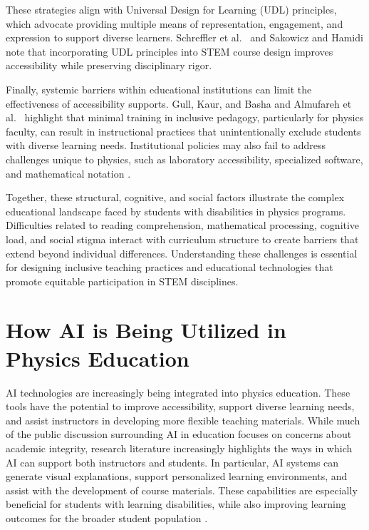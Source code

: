 \documentclass[]{aastex701}
\begin{document}
These strategies align with Universal Design for Learning (UDL) principles, which advocate providing multiple means of representation, engagement, and expression to support diverse learners. Schreffler et al.\ \autocite{Schreffler2019} and Sakowicz and Hamidi \autocite{Sakowicz2025} note that incorporating UDL principles into STEM course design improves accessibility while preserving disciplinary rigor.

Finally, systemic barriers within educational institutions can limit the effectiveness of accessibility supports. Gull, Kaur, and Basha \autocite{Gull2025} and Almufareh et al.\ \autocite{Almufareh2025} highlight that minimal training in inclusive pedagogy, particularly for physics faculty, can result in instructional practices that unintentionally exclude students with diverse learning needs. Institutional policies may also fail to address challenges unique to physics, such as laboratory accessibility, specialized software, and mathematical notation \autocite{Gull2025, Almufareh2025}.

Together, these structural, cognitive, and social factors illustrate the complex educational landscape faced by students with disabilities in physics programs. Difficulties related to reading comprehension, mathematical processing, cognitive load, and social stigma interact with curriculum structure to create barriers that extend beyond individual differences. Understanding these challenges is essential for designing inclusive teaching practices and educational technologies that promote equitable participation in STEM disciplines.


\section{How AI is Being Utilized in Physics Education}
\label{sec:AI_STEMEd}
AI technologies are increasingly being integrated into physics education. These tools have the potential to improve accessibility, support diverse learning needs, and assist instructors in developing more flexible teaching materials. While much of the public discussion surrounding AI in education focuses on concerns about academic integrity, research literature increasingly highlights the ways in which AI can support both instructors and students. In particular, AI systems can generate visual explanations, support personalized learning environments, and assist with the development of course materials. These capabilities are especially beneficial for students with learning disabilities, while also improving learning outcomes for the broader student population \autocite{Voultsiou2025, HarkinsBrown2025, USDOE2023}.
\end{document}
